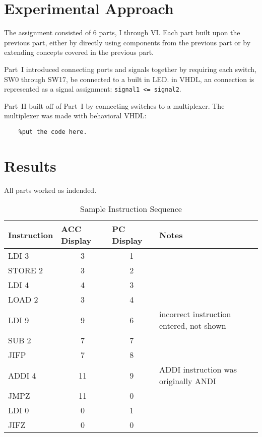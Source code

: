 \documentclass{scrreprt}
\newcommand{\TabLabel}[1]{\label{tab:#1}}
\begin{document}
\section{Experimental Approach}
    The assignment consisted of 6 parts, I through VI. Each part built upon the previous part, either by directly using components from the previous part or by extending concepts covered in the previous part.
    
    Part~I introduced connecting ports and signals together by requiring each switch, SW0 through SW17, be connected to a built in LED. in VHDL, an connection is represented as a signal assignment: \lstinline{signal1 <= signal2}.
    
    Part~II built off of Part~I by connecting switches to a multiplexer. The multiplexer was made with behavioral VHDL:
    
    \begin{lstlisting}
    %put the code here.
    \end{lstlisting}
    
    

\section{Results}
    All parts worked as indended.
    
    \begin{table}[ht]
        \centering
        \begin{tabular}{|l|c|c|l|} \hline
            \bf Instruction & \multicolumn{1}{|l|}{\bf ACC Display} & \multicolumn{1}{|l|}{\bf PC Display} & \bf Notes  \\ \hline
            LDI 3   & 3  & 1 & \\ \hline
            STORE 2 & 3  & 2 & \\ \hline
            LDI 4   & 4  & 3 & \\ \hline
            LOAD 2  & 3  & 4 & \\ \hline
            LDI 9   & 9  & 6 & incorrect instruction entered, not shown\\ \hline
            SUB 2   & 7  & 7 & \\ \hline
            JIFP    & 7  & 8 & \\ \hline
            ADDI 4  & 11 & 9 & ADDI instruction was originally ANDI\\ \hline
            JMPZ    & 11 & 0 & \\ \hline
            LDI 0   & 0  & 1 & \\ \hline
            JIFZ    & 0  & 0 & \\ \hline
        \end{tabular}
        \caption{Sample Instruction Sequence}
        \TabLabel{sample}
    \end{table}
    
\end{document}
